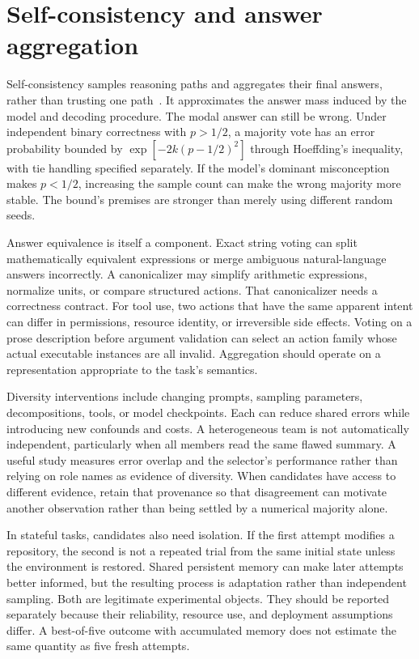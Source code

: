 \section{Self-consistency and answer aggregation}
\label{sec:C09:voting}
Self-consistency samples reasoning paths and aggregates their final answers, rather than trusting one path~\cite{wang2022selfconsistency}. It approximates the answer mass induced by the model and decoding procedure. The modal answer can still be wrong. Under independent binary correctness with $p>1/2$, a majority vote has an error probability bounded by $\exp[-2k(p-1/2)^2]$ through Hoeffding's inequality, with tie handling specified separately. If the model's dominant misconception makes $p<1/2$, increasing the sample count can make the wrong majority more stable. The bound's premises are stronger than merely using different random seeds.

Answer equivalence is itself a component. Exact string voting can split mathematically equivalent expressions or merge ambiguous natural-language answers incorrectly. A canonicalizer may simplify arithmetic expressions, normalize units, or compare structured actions. That canonicalizer needs a correctness contract. For tool use, two actions that have the same apparent intent can differ in permissions, resource identity, or irreversible side effects. Voting on a prose description before argument validation can select an action family whose actual executable instances are all invalid. Aggregation should operate on a representation appropriate to the task's semantics.

Diversity interventions include changing prompts, sampling parameters, decompositions, tools, or model checkpoints. Each can reduce shared errors while introducing new confounds and costs. A heterogeneous team is not automatically independent, particularly when all members read the same flawed summary. A useful study measures error overlap and the selector's performance rather than relying on role names as evidence of diversity. When candidates have access to different evidence, retain that provenance so that disagreement can motivate another observation rather than being settled by a numerical majority alone.

In stateful tasks, candidates also need isolation. If the first attempt modifies a repository, the second is not a repeated trial from the same initial state unless the environment is restored. Shared persistent memory can make later attempts better informed, but the resulting process is adaptation rather than independent sampling. Both are legitimate experimental objects. They should be reported separately because their reliability, resource use, and deployment assumptions differ. A best-of-five outcome with accumulated memory does not estimate the same quantity as five fresh attempts.

